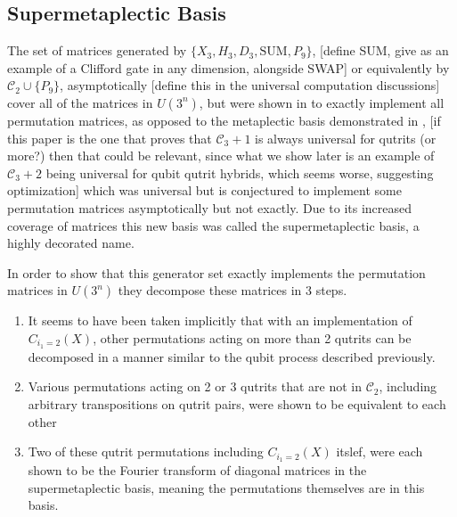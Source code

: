 \subsection{Supermetaplectic Basis}
The set of matrices generated by $\{X_3, H_3, D_3, \text{SUM}, P_9\}$, [define SUM, give as an example of a Clifford gate in any dimension, alongside SWAP] or equivalently by $\mathcal{C}_2 \cup \{P_9\}$, asymptotically [define this in the universal computation discussions] cover all of the matrices in $U\left(3^n\right)$, but were shown in \cite{arithmetics} to exactly implement all permutation matrices, as opposed to the metaplectic basis demonstrated in \cite{topological-anyon-thing}, [if this paper is the one that proves that $\mathcal{C}_3 + 1$ is always universal for qutrits (or more?) then that could be relevant, since what we show later is an example of $\mathcal{C}_3 + 2$ being universal for qubit qutrit hybrids, which seems worse, suggesting optimization] which was universal but is conjectured to implement some permutation matrices asymptotically but not exactly. Due to its increased coverage of matrices this new basis was called the supermetaplectic basis, a highly decorated name.

In order to show that this generator set exactly implements the permutation matrices in $U\left(3^n\right)$ they decompose these matrices in 3 steps.
\begin{enumerate}
	\item It seems to have been taken implicitly that with an implementation of $C_{i_1 = 2}(X)$, other permutations acting on more than 2 qutrits can be decomposed in a manner similar to the qubit process described previously.
	\item Various permutations acting on 2 or 3 qutrits that are not in $\mathcal{C}_2$, including arbitrary transpositions on qutrit pairs, were shown to be equivalent to each other
	\item Two of these qutrit permutations including $C_{i_1=2}(X)$ itslef, were each shown to be the Fourier transform of diagonal matrices in the supermetaplectic basis, meaning the permutations themselves are in this basis.
\end{enumerate}

